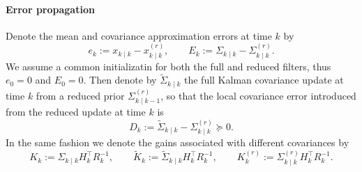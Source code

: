 \documentclass[a4paper,12pt]{article}
\begin{document}
\paragraph{Error propagation}
Denote the mean and covariance approximation errors at time $k$ by
\begin{equation}
    e_k := x_{k \mid k} - x_{k \mid k}^{(r)}, \qquad E_k := \Sigma_{k\mid k} - \Sigma_{k\mid k}^{(r)}.
\end{equation}
We assume a common initializatin for both the full and reduced filters, thus $e_0=0$ and $E_0 = 0$.
Then denote by $\tilde{\Sigma}_{k\mid k}$ the full Kalman covariance update at time $k$ from a reduced prior $\Sigma_{k\mid k-1}^{(r)}$, so that the local covariance error introduced from the reduced update at time $k$ is
\begin{equation}
    D_{k} := \widetilde{\Sigma}_{k\mid k} - \Sigma_{k\mid k}^{(r)} \succeq 0.
\end{equation}
In the same fashion we denote the gains associated with different covariances by
\begin{equation}
    K_k := \Sigma_{k\mid k} H_{k}^{\top} R_{k}^{-1}, \qquad
    \widetilde{K}_k := \widetilde{\Sigma}_{k\mid k} H_{k}^{\top} R_{k}^{-1}, \qquad
    K_{k}^{(r)} := \Sigma_{k\mid k}^{(r)}  H_{k}^{\top} R_{k}^{-1}.
\end{equation}
\end{document}
